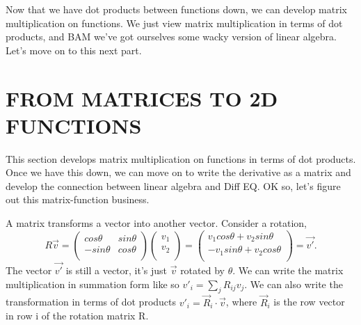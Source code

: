 \documentclass[12pt]{article}
\begin{document}
Now that we have dot products between functions down, we can develop matrix multiplication on functions. We just view matrix multiplication in terms of dot products, and BAM we've got ourselves some wacky version of linear algebra. Let's move on to this next part. 


\section{FROM MATRICES TO 2D FUNCTIONS}
This section develops matrix multiplication on functions in terms of dot products. Once we have this down, we can move on to write the derivative as a matrix and develop the connection between linear algebra and Diff EQ. OK so, let's figure out this matrix-function business. 

A matrix transforms a vector into another vector. Consider a rotation,
\begin{equation}
R\vec{v} = 
\begin{pmatrix}
cos\theta  & sin\theta \\
-sin\theta & cos\theta \\
\end{pmatrix}
\begin{pmatrix}
v_1 \\
v_2 \\
\end{pmatrix}
= 
\begin{pmatrix}
v_1cos\theta  + v_2sin\theta \\
-v_1sin\theta + v_2cos\theta \\
\end{pmatrix}
= \vec{v'}.
\end{equation}
The vector $\vec{v'}$ is still a vector, it's just $\vec{v}$ rotated by $\theta$. We can write the matrix multiplication in summation form like so $v'_i = \sum_j R_{ij}v_j$. We can also write the transformation in terms of dot products $v'_i = \vec{R}_i \cdot \vec{v}$, where $\vec{R}_i$ is the row vector in row i of the rotation matrix R. 
\end{document}
